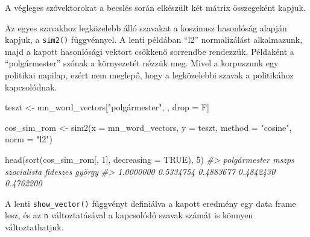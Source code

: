 \documentclass[
]{book}
\newenvironment{Shaded}{\begin{snugshade}}{\end{snugshade}}
\newcommand{\AttributeTok}[1]{\textcolor[rgb]{0.77,0.63,0.00}{#1}}
\newcommand{\CommentTok}[1]{\textcolor[rgb]{0.56,0.35,0.01}{\textit{#1}}}
\newcommand{\ConstantTok}[1]{\textcolor[rgb]{0.00,0.00,0.00}{#1}}
\newcommand{\DecValTok}[1]{\textcolor[rgb]{0.00,0.00,0.81}{#1}}
\newcommand{\FunctionTok}[1]{\textcolor[rgb]{0.00,0.00,0.00}{#1}}
\newcommand{\NormalTok}[1]{#1}
\newcommand{\OtherTok}[1]{\textcolor[rgb]{0.56,0.35,0.01}{#1}}
\newcommand{\SpecialCharTok}[1]{\textcolor[rgb]{0.00,0.00,0.00}{#1}}
\newcommand{\StringTok}[1]{\textcolor[rgb]{0.31,0.60,0.02}{#1}}
\begin{document}
A végleges szóvektorokat a becslés során elkészült két mátrix
összegeként kapjuk.

\begin{Shaded}
\end{Shaded}

Az egyes szavakhoz legközelebb álló szavakat a koszinusz hasonlóság
alapján kapjuk, a \texttt{sim2()} függvénnyel. A lenti példában ``l2''
normalizálást alkalmazunk, majd a kapott hasonlósági vektort csökkenő
sorrendbe rendezzük. Példaként a ``polgármester'' szónak a környezetét
nézzük meg. Mivel a korpuszunk egy politikai napilap, ezért nem meglepő,
hogy a legközelebbi szavak a politikához kapcsolódnak.

\begin{Shaded}
\begin{Highlighting}[]
\NormalTok{teszt }\OtherTok{\textless{}{-}}\NormalTok{ mn\_word\_vectors[}\StringTok{"polgármester"}\NormalTok{, , drop }\OtherTok{=}\NormalTok{ F]}

\NormalTok{cos\_sim\_rom }\OtherTok{\textless{}{-}} \FunctionTok{sim2}\NormalTok{(}\AttributeTok{x =}\NormalTok{ mn\_word\_vectors, }\AttributeTok{y =}\NormalTok{ teszt, }\AttributeTok{method =} \StringTok{"cosine"}\NormalTok{, }\AttributeTok{norm =} \StringTok{"l2"}\NormalTok{)}

\FunctionTok{head}\NormalTok{(}\FunctionTok{sort}\NormalTok{(cos\_sim\_rom[, }\DecValTok{1}\NormalTok{], }\AttributeTok{decreasing =} \ConstantTok{TRUE}\NormalTok{), }\DecValTok{5}\NormalTok{)}
\CommentTok{\#\textgreater{} polgármester        mszps  szocialista     fideszes       györgy }
\CommentTok{\#\textgreater{}    1.0000000    0.5334754    0.4883677    0.4842430    0.4762200}
\end{Highlighting}
\end{Shaded}

A lenti \texttt{show\_vector()} függvényt definiálva a kapott eredmény
egy data frame lesz, és az \texttt{n} változtatásával a kapcsolódó
szavak számát is könnyen változtathatjuk.
\end{document}
